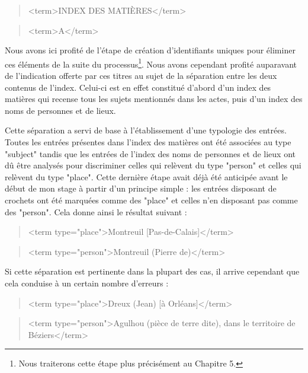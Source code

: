 \documentclass[a4paper,12pt,twoside]{book}
\begin{document}
	\begin{quotation}
		<term>INDEX DES MATIÈRES</term>
	\end{quotation}

	\begin{quotation}
		<term>A</term>
	\end{quotation}

	\noindent Nous avons ici profité de l'étape de création d'identifiants uniques pour éliminer ces éléments de la suite du processus\footnote{Nous traiterons cette étape plus précisément au Chapitre 5.}. Nous avons cependant profité auparavant de l'indication offerte par ces titres au sujet de la séparation entre les deux contenus de l'index. Celui-ci est en effet constitué d'abord d'un index des matières qui recense tous les sujets mentionnés dans les actes, puis d'un index des noms de personnes et de lieux. 
	
	Cette séparation a servi de base à l'établissement d'une typologie des entrées. Toutes les entrées présentes dans l'index des matières ont été associées au type "subject" tandis que les entrées de l'index des noms de personnes et de lieux ont dû être analysés pour discriminer celles qui relèvent du type "person" et celles qui relèvent du type "place". Cette dernière étape avait déjà été anticipée avant le début de mon stage à partir d'un principe simple : les entrées disposant de crochets ont été marquées comme des "place" et celles n'en disposant pas comme des "person". Cela donne ainsi le résultat suivant : 
	
	\begin{quotation}
		<term type="place">Montreuil [Pas-de-Calais]</term>
	\end{quotation}

	\begin{quotation}
		<term type="person">Montreuil (Pierre de)</term>
	\end{quotation}

	\noindent Si cette séparation est pertinente dans la plupart des cas, il arrive cependant que cela conduise à un certain nombre d'erreurs :
	
	\begin{quotation}
		<term type="place">Dreux (Jean) [à Orléans]</term>
	\end{quotation}
	
	\begin{quotation}
		<term type="person">Agulhou (pièce de terre dite), dans le territoire de
			Béziers</term>
	\end{quotation}
	
\end{document}
